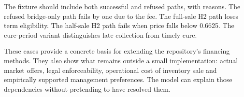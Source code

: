 The fixture should include both successful and refused paths, with reasons. The refused bridge-only path fails by one due to the fee. The full-sale H2 path loses term eligibility. The half-sale H2 path fails when price falls below 0.6625. The cure-period variant distinguishes late collection from timely cure.

These cases provide a concrete basis for extending the repository's financing methods. They also show what remains outside a small implementation: actual market offers, legal enforceability, operational cost of inventory sale and empirically supported management preferences. The model can explain those dependencies without pretending to have resolved them.


